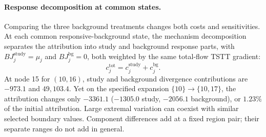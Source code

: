 \paragraph{Response decomposition at common states.}\label{subsec:bgsplit}
Comparing the three background treatments changes both costs and sensitivities. At each common responsive-background state, the mechanism decomposition separates the attribution into study and background response parts, with $BJ_j^{\mathrm{study}}=\mu_j$ and $BJ_j^{\mathrm{bg}}=0$, both weighted by the same total-flow TSTT gradient:
\begin{equation}
c_j^{\mathrm{tot}}=c_j^{\mathrm{study}}+c_j^{\mathrm{bg}}.
\label{eq:bg_attribution}
\end{equation}
At node 15 for $(10,16)$, study and background divergence contributions are $-973.1$ and $49{,}103.4$. Yet on the specified expansion $\{10\}\to\{10,17\}$, the attribution changes only $-3361.1$ ($-1305.0$ study, $-2056.1$ background), or $1.23\%$ of the initial attribution. Large extremal variation can coexist with similar selected boundary values. Component differences add at a fixed region pair; their separate ranges do not add in general.

